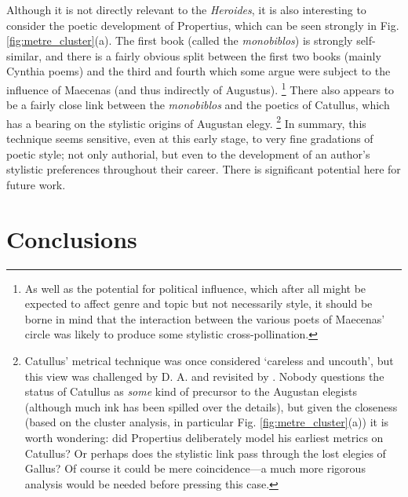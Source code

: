 \documentclass[twocolumn, switch, a4paper]{article} %
\begin{document}
Although it is not directly relevant to the \emph{Heroides}, it is also
interesting to consider the poetic development of Propertius, which can be
seen strongly in Fig. \ref{fig:metre_cluster}(a). The first book (called the
\emph{monobiblos}) is strongly self-similar, and there is a fairly obvious
split between the first two books (mainly Cynthia poems) and the third and
fourth which some argue were subject to the influence of Maecenas (and thus
indirectly of Augustus).%
%
    \footnote{As well as the potential for political influence, which after
    all might be expected to affect genre and topic but not necessarily
    style, it should be borne in mind that the interaction between the various
    poets of Maecenas' circle was likely to produce some stylistic
    cross-pollination.}
%
There also appears to be a fairly close link between the \emph{monobiblos} and
the poetics of Catullus, which has a bearing on the stylistic origins of
Augustan elegy.%
%
    \footnote{Catullus' metrical technique was once considered `careless and
    uncouth', but this view was challenged by D. A.  and
    revisited by . Nobody questions the status of
    Catullus as \emph{some} kind of precursor to the Augustan elegists
    (although much ink has been spilled over the details), but given the
    closeness (based on the cluster analysis, in particular Fig.
    \ref{fig:metre_cluster}(a)) it is worth wondering: did Propertius
    deliberately model his earliest metrics on Catullus? Or perhaps does the
    stylistic link pass through the lost elegies of Gallus? Of course it could
    be mere coincidence---a much more rigorous analysis would be needed before
    pressing this case.}
%
In summary, this technique seems sensitive, even at this early
stage, to very fine gradations of poetic style; not only authorial, but even
to the development of an author's stylistic preferences throughout their
career. There is significant potential here for future work.

\section{Conclusions}
\end{document}
